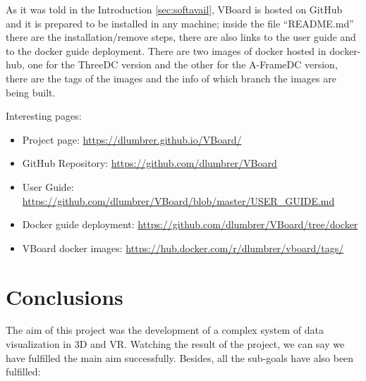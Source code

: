 \documentclass[a4paper, 12pt]{book}
\begin{document}
As it was told in the Introduction \ref{sec:softavail}, VBoard is hosted on GitHub and it is prepared to be installed in any machine; inside the file “README.md” there are the installation/remove steps, there are also links to the user guide and to the docker guide deployment. There are two images of docker hosted in docker-hub, one for the ThreeDC version and the other for the A-FrameDC version, there are the tags of the images and the info of which branch the images are being built.

Interesting pages:

\begin{itemize}
\item Project page: \url{https://dlumbrer.github.io/VBoard/}
\item GitHub Repository: \url{https://github.com/dlumbrer/VBoard}
\item User Guide: \url{https://github.com/dlumbrer/VBoard/blob/master/USER_GUIDE.md}
\item Docker guide deployment: \url{https://github.com/dlumbrer/VBoard/tree/docker}
\item VBoard docker images: \url{https://hub.docker.com/r/dlumbrer/vboard/tags/}
\end{itemize}


\cleardoublepage
\chapter{Conclusions}
\label{chap:conclusions}
The aim of this project was the development of a complex system of data visualization in 3D and VR. Watching the result of the project, we can say we have fulfilled the main aim successfully. Besides, all the sub-goals have also been fulfilled:
\end{document}
